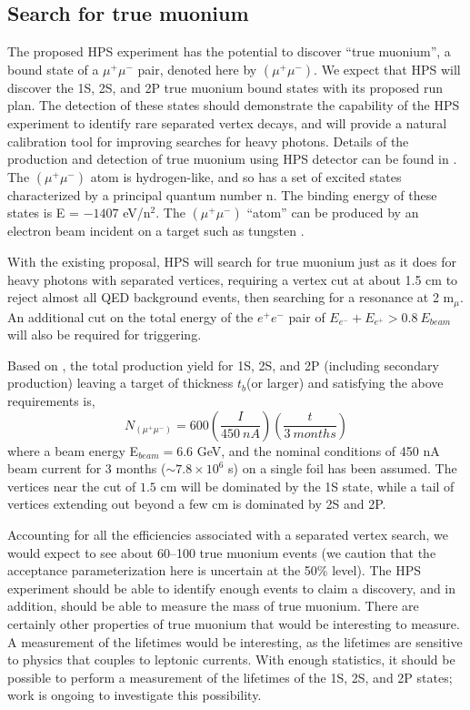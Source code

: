 \subsection{Search for true muonium}

The proposed HPS experiment has the potential to discover ``true muonium'', a bound state of a
$\mu^+ \mu^-$ pair, denoted here by $(\mu^+ \mu^-)$. 
We expect that HPS will discover the 1S, 2S, and 2P true muonium bound states with its proposed run plan. 
The detection of these states should demonstrate the capability of the HPS experiment 
to identify rare separated vertex decays, and will provide a natural calibration 
tool for improving searches for heavy photons. Details of the production and detection of true muonium using HPS detector can be found in \cite{HPS_PROP_UPD}. 
The $(\mu^+ \mu^-)$ atom is hydrogen-like, and so has a set of excited states characterized by a principal quantum number n. 
The binding energy of these states is E = $-1407$ eV/n$^2$. The $(\mu^+ \mu^-)$ ``atom'' can be produced by an electron beam incident on a target such 
as tungsten \cite{Holvik:1986ty,ArteagaRomero:2000yh}. 

With the existing proposal, HPS will search for true muonium
just as it does for heavy photons with separated vertices, requiring a vertex cut at about 1.5 cm to reject almost all
QED background events, then searching for a resonance at 2 m$_{\mu}$. An additional cut 
on the total energy of the $e^+e^-$ pair of $E_{e^-}+E_{e^+}> 0.8 \ E_{beam}$ will also be required
for triggering. 

Based on \cite{toAppear}, the total production yield for 1S, 2S, and 2P (including secondary production)
leaving a target of thickness $t_b$(or larger) and satisfying the above requirements is,
\begin{equation}
N_{(\mu^+ \mu^-)} = 600 \left( \frac{I}{450 \ nA} \right) \left( \frac{t}{3 \ months} \right)
\end{equation}
%
where a beam energy E$_{beam} = 6.6$ GeV, and the nominal conditions
of 450 nA beam current for 3 months ($\sim 7.8 \times 10^6$ s) on a single foil has been assumed.
The vertices near the cut of $1.5$ cm will be dominated by the 1S state, while 
a tail of vertices extending out beyond a few cm is dominated by 2S and 2P. 

Accounting for all the efficiencies associated with a separated vertex search, we would expect to see about 60--100 true muonium events 
(we caution that the acceptance parameterization here is uncertain at the 50\% level).
The HPS experiment should be able to identify enough events to claim a discovery, and in addition, should be able to measure the mass of true muonium.  There are certainly other properties of true muonium that would be interesting to measure.  A measurement of the lifetimes would be interesting, as the lifetimes are sensitive to physics that couples to leptonic currents.  With enough statistics, it should be possible to perform a measurement of the lifetimes of the 1S, 2S, and 2P states; work is ongoing to investigate this possibility.  

